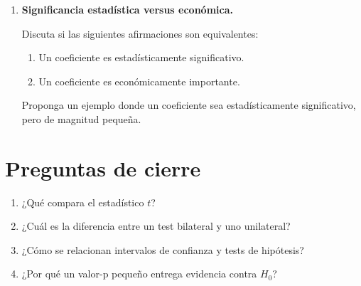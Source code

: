 \documentclass[11pt]{article}
\begin{document}
\begin{enumerate}[label=\textbf{Ejercicio \arabic*.}, leftmargin=*]
\item \textbf{Significancia estadística versus económica.}

Discuta si las siguientes afirmaciones son equivalentes:

\begin{enumerate}[label=\alph*)]
    \item Un coeficiente es estadísticamente significativo.
    \item Un coeficiente es económicamente importante.
\end{enumerate}

Proponga un ejemplo donde un coeficiente sea estadísticamente significativo, pero de magnitud pequeña.

\end{enumerate}

\section*{Preguntas de cierre}

\begin{enumerate}[label=\arabic*.]
    \item ¿Qué compara el estadístico \(t\)?
    \item ¿Cuál es la diferencia entre un test bilateral y uno unilateral?
    \item ¿Cómo se relacionan intervalos de confianza y tests de hipótesis?
    \item ¿Por qué un valor-p pequeño entrega evidencia contra \(H_0\)?
\end{enumerate}
\end{document}
